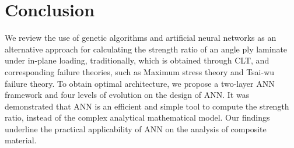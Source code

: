 \section{Conclusion}
We review the use of genetic algorithms and artificial neural networks as an
alternative approach for calculating the strength ratio of an angle ply
laminate under in-plane loading, traditionally, which is obtained through CLT,
and corresponding failure theories, such as Maximum stress theory and Tsai-wu
failure theory. To obtain optimal architecture, we propose a two-layer ANN
framework and four levels of evolution on the design of ANN.  It was
demonstrated that ANN is an efficient and simple tool to compute the strength
ratio, instead of the complex analytical mathematical model. Our findings
underline the practical applicability of ANN on the analysis of composite
material.  


